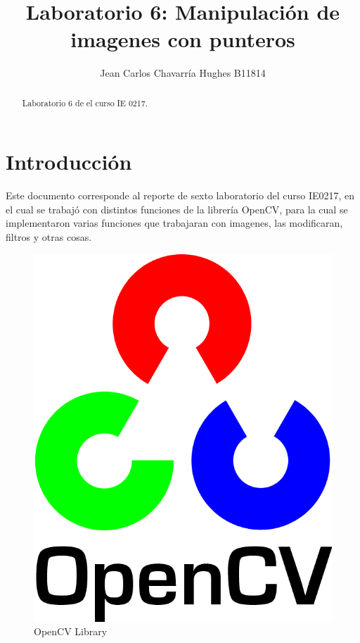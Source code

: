 \documentclass{article}
\begin{document}
\title{Laboratorio 6: Manipulaci\' on de imagenes con punteros}
\author{Jean Carlos Chavarr\' ia Hughes B11814}
\maketitle
\begin{abstract}
Laboratorio 6 de el curso IE 0217.
\end{abstract}
\section{Introducci\' on}
Este documento corresponde al reporte de sexto laboratorio del curso IE0217, en el cual se trabaj\' o con distintos funciones de la librer\' ia OpenCV, para la cual se implementaron varias funciones que trabajaran con imagenes, las modificaran, filtros y otras cosas.

\begin{figure}[hbtp]
\caption{OpenCV Library}
\centering
\includegraphics[scale=1]{imagenes/OpenCV_Logo_with_text.png}
\end{figure}
\end{document}
